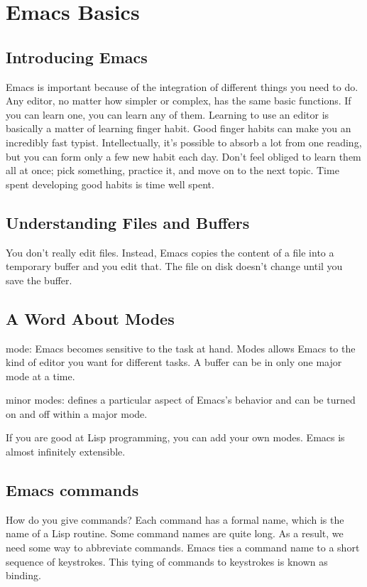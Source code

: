 \documentclass{book}
\begin{document}
\tableofcontents{}

\chapter{Emacs Basics}

\section{Introducing Emacs}

Emacs is important because of the integration of different things you need to do.
Any editor, no matter how simpler or complex, has the same basic functions.
If you can learn one, you can learn any of them.
Learning to use an editor is basically a matter of learning finger habit.
Good finger habits can make you an incredibly fast typist.
Intellectually, it's possible to absorb a lot from one reading, but you can form only a few new habit each day.
Don't feel obliged  to learn them all at once; pick something, practice it, and move on to the next topic.
Time spent developing good habits is time well spent.

\section{Understanding Files and Buffers}
You don't really edit files.
Instead, Emacs copies the content of a file into a temporary buffer and you edit that.
The file on disk doesn't change until you save the buffer.

\section{A Word About Modes}

mode: Emacs becomes sensitive to the task at hand.
Modes allows Emacs to the kind of editor you want for different tasks.
A buffer can be in only one major mode at a time.

minor modes: defines a particular aspect of Emacs's behavior and can be turned on and off within a major mode.

If you are good at Lisp programming, you can add your own modes. Emacs is almost infinitely extensible.

\section{Emacs commands}
How do you give commands?
Each command has a formal name, which is the name of a Lisp routine. Some command names are quite long. As a result, we need some way to abbreviate commands. Emacs ties a command name to a short sequence of keystrokes. This tying of commands to keystrokes is known as binding. 
\end{document}
